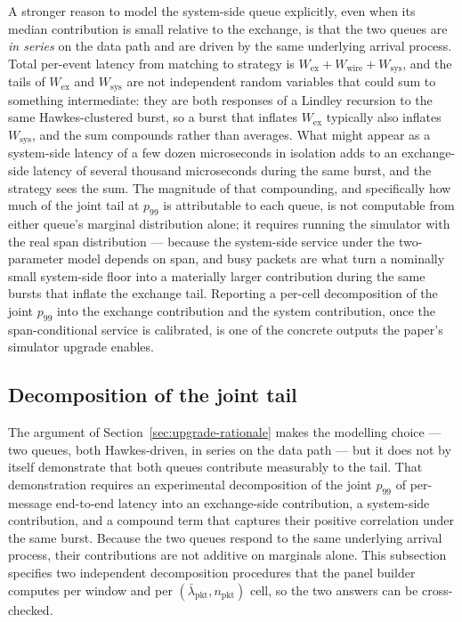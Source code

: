 \documentclass[11pt]{article}
\begin{document}
A stronger reason to model the system-side queue explicitly, even when its median contribution is small relative to the exchange, is that the two queues are \emph{in series} on the data path and are driven by the same underlying arrival process. Total per-event latency from matching to strategy is $W_{\mathrm{ex}} + W_{\mathrm{wire}} + W_{\mathrm{sys}}$, and the tails of $W_{\mathrm{ex}}$ and $W_{\mathrm{sys}}$ are not independent random variables that could sum to something intermediate: they are both responses of a Lindley recursion to the same Hawkes-clustered burst, so a burst that inflates $W_{\mathrm{ex}}$ typically also inflates $W_{\mathrm{sys}}$, and the sum compounds rather than averages. What might appear as a system-side latency of a few dozen microseconds in isolation adds to an exchange-side latency of several thousand microseconds during the same burst, and the strategy sees the sum. The magnitude of that compounding, and specifically how much of the joint tail at $p_{99}$ is attributable to each queue, is not computable from either queue's marginal distribution alone; it requires running the simulator with the real span distribution --- because the system-side service under the two-parameter model depends on span, and busy packets are what turn a nominally small system-side floor into a materially larger contribution during the same bursts that inflate the exchange tail. Reporting a per-cell decomposition of the joint $p_{99}$ into the exchange contribution and the system contribution, once the span-conditional service is calibrated, is one of the concrete outputs the paper's simulator upgrade enables.

\subsection{Decomposition of the joint tail}
\label{sec:upgrade-decomposition}

The argument of Section~\ref{sec:upgrade-rationale} makes the modelling choice --- two queues, both Hawkes-driven, in series on the data path --- but it does not by itself demonstrate that both queues contribute measurably to the tail. That demonstration requires an experimental decomposition of the joint $p_{99}$ of per-message end-to-end latency into an exchange-side contribution, a system-side contribution, and a compound term that captures their positive correlation under the same burst. Because the two queues respond to the same underlying arrival process, their contributions are not additive on marginals alone. This subsection specifies two independent decomposition procedures that the panel builder computes per window and per $(\bar\lambda_{\mathrm{pkt}}, n_{\mathrm{pkt}})$ cell, so the two answers can be cross-checked.
\end{document}
